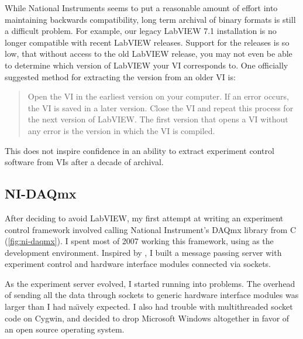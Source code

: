 While National Instruments seems to put a reasonable amount of effort
into maintaining backwards compatibility, long term archival of binary
formats is still a difficult problem.  For example, our legacy LabVIEW
7.1 installation is no longer compatible with recent LabVIEW releases.
Support for the releases is so low, that without access to the old
LabVIEW release, you may not even be able to determine which version
of LabVIEW your VI corresponds to.  One officially suggested method
for extracting the version from an older VI is\citep{ni-vi-version}:

\begin{quote}
  Open the VI in the earliest version on your computer.  If an error
  occurs, the VI is saved in a later version.  Close the VI and repeat
  this process for the next version of LabVIEW.  The first version
  that opens a VI without any error is the version in which the VI is
  compiled.
\end{quote}

This does not inspire confidence in an ability to extract experiment
control software from VIs after a decade of
archival\citep{ni-vi-upgrade}.

\subsection{NI-DAQmx}
\label{sec:ni-daqmx}

After deciding to avoid LabVIEW, my first attempt at writing an
experiment control framework involved calling National Instrument's
DAQmx library from C\citep{ni-daqmx} (\cref{fig:ni-daqmx}).  I spent
most of 2007 working this framework, using  as the
development environment.  Inspired by , I built a
message passing server with experiment control and hardware interface
modules connected via sockets.

As the experiment server evolved, I started running into problems.
The overhead of sending all the data through sockets to generic
hardware interface modules was larger than I had na\"{\i}vely
expected.  I also had trouble with multithreaded socket code on
Cygwin, and decided to drop Microsoft Windows altogether in favor of
an open source operating system.

